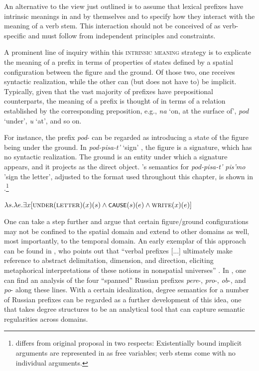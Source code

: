 \documentclass[output=paper,colorlinks,citecolor=brown]{langscibook}
\begin{document}
An alternative to the view just outlined is to assume that lexical prefixes have  intrinsic meanings in and by themselves and to specify how they interact with the meaning of a verb stem. This interaction should not be conceived of as verb-specific and must follow from independent principles and constraints.

A prominent line of inquiry within this \textsc{intrinsic meaning} strategy is to explicate the meaning of a prefix in terms of properties of states defined by a spatial configuration between the figure and the ground. Of those two, one receives syntactic realization, while the other can (but does not have to) be implicit. Typically, given that the vast majority of prefixes have prepositional counterparts, the meaning of a prefix is thought of in terms of a relation established by the corresponding preposition, e.g., \textit{na} ‘on, at the surface of’, \textit{pod} ‘under’,  \textit{u} ‘at’, and so on. 

For instance, the prefix \textit{pod}- can be regarded as introducing a state of the figure being under the ground. In \textit{pod-pisa-t’} ‘sign’ \citep[67]{Biskup2019}, the figure is a signature, which has no syntactic realization. The ground is an entity under which a signature appears, and it projects as the direct object. \citeauthor{Biskup2019}’s semantics for \textit{pod-pisa-t' pis'mo} 'sign the letter', adjusted to the format used throughout this chapter, is shown in .\footnote{ differs from  original proposal in two respects: Existentially bound implicit arguments are represented in \citeauthor{Biskup2019} as free variables; verb stems come with no individual arguments.}

\ea   $\lambda s.\lambda e.\exists x [\textsc{under}(\textsc{letter})(x)(s) \wedge \cnst{cause}(s)(e) \wedge \textsc{write}(x)(e)]$\label{ex:tatevosov:118}
\z

\noindent One can take a step further and argue that certain figure/ground configurations may not be confined to the spatial domain and extend to other domains as well, most importantly, to the temporal domain. An early exemplar of this approach can be found in \citet{Flier1975}, who points out that “verbal prefixes [...] ultimately make reference to abstract delimitation, dimension, and direction, eliciting met\-a\-phor\-i\-cal interpretations of these notions in nonspatial universes” \citep[219]{Flier1975}. In \citet{Flier1975}, one can find an analysis of the four “spanned” Russian prefixes \textit{pere}-, \textit{pro}-, \textit{ob}-, and \textit{po}- along these lines. With a certain idealization,  degree semantics for a number of Russian prefixes can be regarded as a further development of this idea, one that takes degree structures to be an analytical tool that can capture semantic regularities across domains. 
\end{document}
